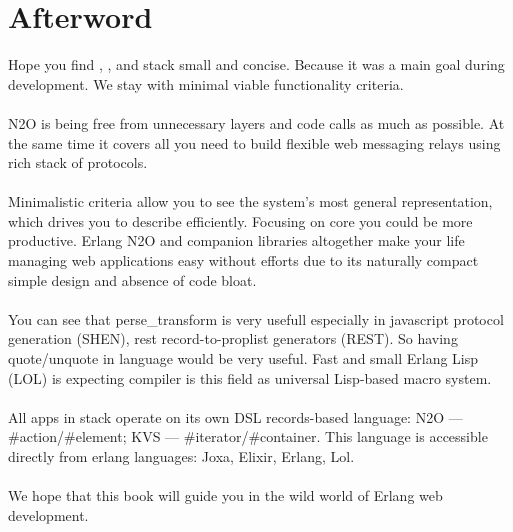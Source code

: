 
\begingroup
\section{Afterword}

Hope you find ,
, and
 stack small and concise.
Because it was a main goal during development.
We stay with minimal viable functionality criteria.

\paragraph{}
N2O is being free from unnecessary layers and code calls as much as possible.
At the same time it covers all you need to build
flexible web messaging relays using rich stack of protocols.

\paragraph{}
Minimalistic criteria allow you to see the system's
most general representation, which drives you to describe efficiently.
Focusing on core you could be more productive.
Erlang N2O and companion libraries altogether make
your life managing web applications easy without
efforts due to its naturally compact simple design and absence of code bloat.

\paragraph{}
You can see that perse\_transform is very usefull especially in javascript
protocol generation (SHEN), rest record-to-proplist generators (REST). So having
quote/unquote in language would be very useful. Fast and small
Erlang Lisp (LOL) is expecting compiler is this field as universal
Lisp-based macro system.

\paragraph{}
All apps in stack operate on its own DSL
records-based language: N2O --- \#action/\#element; KVS --- \#iterator/\#container.
This language is accessible directly from erlang languages: Joxa, Elixir, Erlang, Lol.

\paragraph{}
We hope that this book will guide you in the wild world of Erlang web development.
\endgroup

